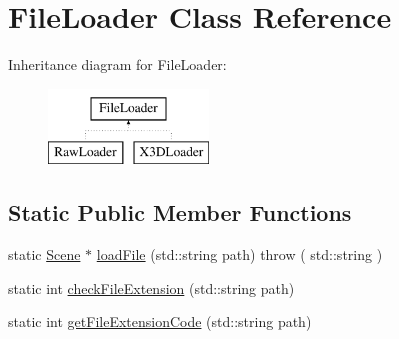 \hypertarget{classFileLoader}{
\section{FileLoader Class Reference}
\label{classFileLoader}
}
Inheritance diagram for FileLoader:\begin{figure}[H]
\begin{center}
\leavevmode
\includegraphics[height=2.000000cm]{classFileLoader}
\end{center}
\end{figure}
\subsection*{Static Public Member Functions}
\begin{DoxyCompactItemize}
\item 
static \hyperlink{classScene}{Scene} $\ast$ \hyperlink{classFileLoader_aa10ddbcfa87213ec2d2ade5a51f4cbe0}{loadFile} (std::string path)  throw ( std::string )
\item 
static int \hyperlink{classFileLoader_a9586cbf540f225cc16a9fc90e22edad9}{checkFileExtension} (std::string path)
\item 
static int \hyperlink{classFileLoader_a32bc1a5954be88d3df694b106aff7e83}{getFileExtensionCode} (std::string path)
\end{DoxyCompactItemize}


